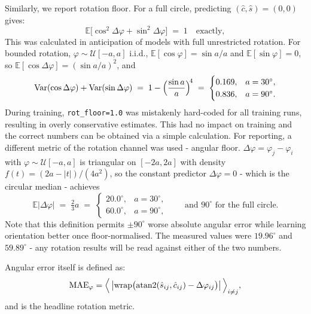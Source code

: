 \documentclass[final_report.tex]{subfiles}
\begin{document}
Similarly, we report rotation floor. For a full circle, predicting $(\hat c, \hat s)=(0,0)$ gives:
\begin{equation}\label{eq:rot-floor-uniform}
  \mathbb{E}\bigl[\cos^2\Delta\varphi + \sin^2\Delta\varphi\bigr] \;=\; 1 \quad\text{exactly},
\end{equation}
This was calculated in anticipation of models with full unrestricted rotation. For bounded rotation, $\varphi \sim \mathcal{U}[-a, a]$ i.i.d.,
$\mathbb{E}[\cos\varphi] = \sin a / a$ and $\mathbb{E}[\sin\varphi] = 0$, so $\mathbb{E}[\cos\Delta\varphi] = (\sin a / a)^2$, and
\begin{equation}\label{eq:rot-floor-bounded}
  \operatorname{Var}(\cos\Delta\varphi) + \operatorname{Var}(\sin\Delta\varphi)
  \;=\; 1 - \Bigl(\frac{\sin a}{a}\Bigr)^{\!4}
  \;=\;
  \begin{cases} 0.169, & a = 30^\circ,\\ 0.836, & a = 90^\circ.\end{cases}
\end{equation}
During training, \texttt{rot\_floor=1.0} was mistakenly hard-coded for all training runs, resulting in overly conservative estimates. This had no impact on training and the correct numbers can be obtained via a simple calculation. For reporting, a different metric of the rotation channel was used - angular floor. $\Delta\varphi = \varphi_j - \varphi_i$ with $\varphi \sim
\mathcal{U}[-a,a]$ is triangular on $[-2a, 2a]$ with density
$f(t) = (2a - |t|)/(4a^2)$, so the constant predictor $\Delta\varphi = 0$ - which is
the circular median - achieves
\begin{equation}\label{eq:ang-floor}
  \mathbb{E}\bigl|\Delta\varphi\bigr| \;=\; \tfrac{2}{3} a
  \;=\;
  \begin{cases} 20.0^\circ, & a = 30^\circ,\\ 60.0^\circ, & a = 90^\circ,\end{cases}
  \qquad\text{and } 90^\circ \text{ for the full circle.}
\end{equation}
Note that this definition permits $\pm90^\circ$ worse absolute angular error while learning orientation better once floor-normalised. The measured values were $19.96^\circ$ and $59.89^\circ$ - any rotation results will be read against either of the two numbers.

Angular error itself is defined as:
\begin{equation}\label{eq:metric-ang-mae}
  \mathrm{MAE}_\varphi
  = \Bigl\langle\, \bigl|\operatorname{wrap}\bigl(\operatorname{atan2}(\hat s_{ij}, \hat c_{ij}) - \Delta\varphi_{ij}\bigr)\bigr| \,\Bigr\rangle_{i \neq j},
\end{equation}
and is the headline rotation metric.
\end{document}
